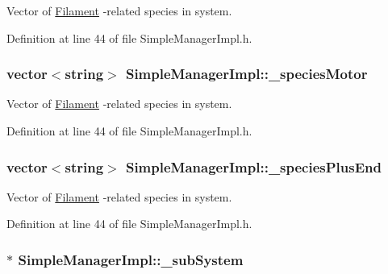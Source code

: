 Vector of \hyperlink{classFilament}{Filament} -\/related species in system. 



Definition at line 44 of file Simple\+Manager\+Impl.\+h.

\hypertarget{classSimpleManagerImpl_a5ff19b12a756eaba341d179b795ed6b4}{
\subsubsection[{\+\_\+species\+Motor}]{\setlength{\rightskip}{0pt plus 5cm}vector$<$string$>$ Simple\+Manager\+Impl\+::\+\_\+species\+Motor\hspace{0.3cm}{\ttfamily [private]}}}\label{classSimpleManagerImpl_a5ff19b12a756eaba341d179b795ed6b4}


Vector of \hyperlink{classFilament}{Filament} -\/related species in system. 



Definition at line 44 of file Simple\+Manager\+Impl.\+h.

\hypertarget{classSimpleManagerImpl_a8c41d3d46a0534a7127d5b863718bcba}{
\subsubsection[{\+\_\+species\+Plus\+End}]{\setlength{\rightskip}{0pt plus 5cm}vector$<$string$>$ Simple\+Manager\+Impl\+::\+\_\+species\+Plus\+End\hspace{0.3cm}{\ttfamily [private]}}}\label{classSimpleManagerImpl_a8c41d3d46a0534a7127d5b863718bcba}


Vector of \hyperlink{classFilament}{Filament} -\/related species in system. 



Definition at line 44 of file Simple\+Manager\+Impl.\+h.

\hypertarget{classSimpleManagerImpl_a3815d1181b7c1a25aca95701dd6d8188}{
\subsubsection[{\+\_\+sub\+System}]{$\ast$ Simple\+Manager\+Impl\+::\+\_\+sub\+System\hspace{0.3cm}{\ttfamily [private]}}}\label{classSimpleManagerImpl_a3815d1181b7c1a25aca95701dd6d8188}


